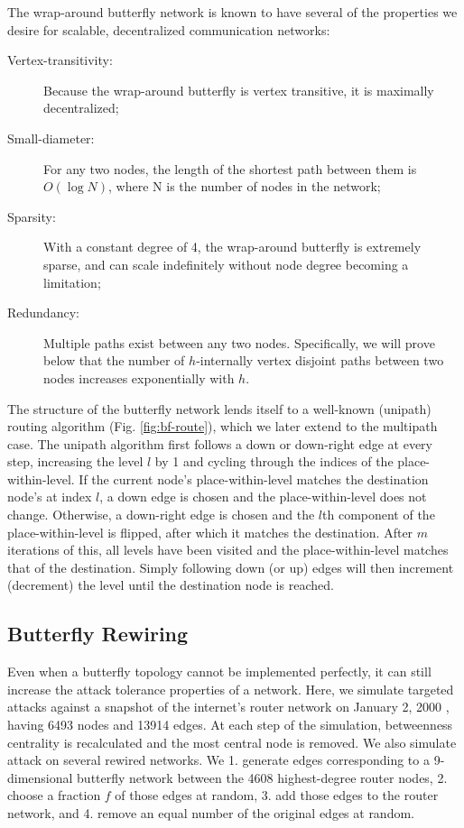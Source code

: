 \documentclass[10pt,letterpaper]{article}
\begin{document}
The wrap-around butterfly network is known to have several of the properties
we desire for scalable, decentralized communication networks:
\begin{description}
\item[Vertex-transitivity:]
Because the wrap-around butterfly is vertex transitive,
it is maximally decentralized;
\item[Small-diameter:]
For any two nodes, the length of the shortest path between them is
$O(\log N)$, where N is the number of nodes in the network;
\item[Sparsity:]
With a constant degree of 4, the wrap-around butterfly is extremely sparse,
and can scale indefinitely without node degree becoming a limitation;
\item [Redundancy:]
Multiple paths exist between any two nodes.
Specifically, we will prove below that the number of
$h$-internally vertex disjoint paths between two
nodes increases exponentially with $h$.
\end{description}

The structure of the butterfly network lends itself to a well-known
(unipath) routing algorithm (Fig. \ref{fig:bf-route}),
which we later extend to the multipath case.
The unipath algorithm first follows a down or down-right edge at every step,
increasing the level $l$ by 1 and cycling through the
indices of the place-within-level.
If the current node's place-within-level matches the destination node's at
index $l$,
a down edge is chosen and the place-within-level does not change.
Otherwise, a down-right edge is chosen and the $l$th component of the
place-within-level is flipped,
after which it matches the destination.
After $m$ iterations of this, all levels have been visited
and the place-within-level matches that of the destination.
Simply following down (or up) edges will then increment (decrement) the
level until the destination node is reached.

\subsection*{Butterfly Rewiring}

Even when a butterfly topology cannot be implemented perfectly,
it can still increase the attack tolerance properties of a network.
Here, we simulate targeted attacks against a snapshot of the internet's
router network on January 2, 2000
\cite{leskovec_graphs_2005}, having 6493 nodes and 13914 edges.
At each step of the simulation, betweenness centrality is recalculated and the
most central node is removed.
We also simulate attack on several rewired networks.
We 1. generate edges corresponding to a 9-dimensional butterfly network between
the 4608 highest-degree router nodes,
2. choose a fraction $f$ of those edges at random,
3. add those edges to the router network, and
4. remove an equal number of the original edges at random.
\end{document}
